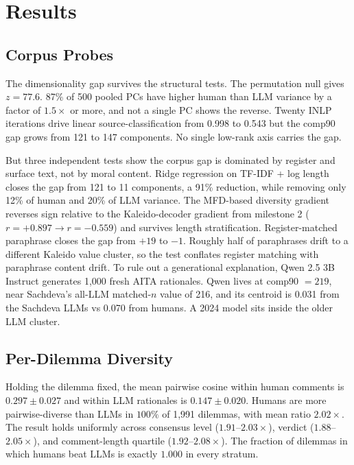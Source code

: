 \documentclass[11pt,a4paper]{article}
\begin{document}
\section{Results}

\subsection{Corpus Probes}

The dimensionality gap survives the structural tests. The permutation null gives $z{=}77.6$. 87\% of 500 pooled PCs have higher human than LLM variance by a factor of $1.5\times$ or more, and not a single PC shows the reverse. Twenty INLP iterations drive linear source-classification from 0.998 to 0.543 but the comp90 gap grows from 121 to 147 components. No single low-rank axis carries the gap.

But three independent tests show the corpus gap is dominated by register and surface text, not by moral content. Ridge regression on TF-IDF + log length closes the gap from 121 to 11 components, a 91\% reduction, while removing only 12\% of human and 20\% of LLM variance. The MFD-based diversity gradient reverses sign relative to the Kaleido-decoder gradient from milestone 2 ($r{=}+0.897 \to r{=}-0.559$) and survives length stratification. Register-matched paraphrase closes the gap from $+19$ to $-1$. Roughly half of paraphrases drift to a different Kaleido value cluster, so the test conflates register matching with paraphrase content drift. To rule out a generational explanation, Qwen 2.5 3B Instruct generates 1,000 fresh AITA rationales. Qwen lives at comp90 $=219$, near Sachdeva's all-LLM matched-$n$ value of 216, and its centroid is 0.031 from the Sachdeva LLMs vs 0.070 from humans. A 2024 model sits inside the older LLM cluster.

\subsection{Per-Dilemma Diversity}

Holding the dilemma fixed, the mean pairwise cosine within human comments is $0.297 \pm 0.027$ and within LLM rationales is $0.147 \pm 0.020$. Humans are more pairwise-diverse than LLMs in $100\%$ of 1,991 dilemmas, with mean ratio $2.02\times$. The result holds uniformly across consensus level ($1.91$--$2.03\times$), verdict ($1.88$--$2.05\times$), and comment-length quartile ($1.92$--$2.08\times$). The fraction of dilemmas in which humans beat LLMs is exactly $1.000$ in every stratum.
\end{document}
